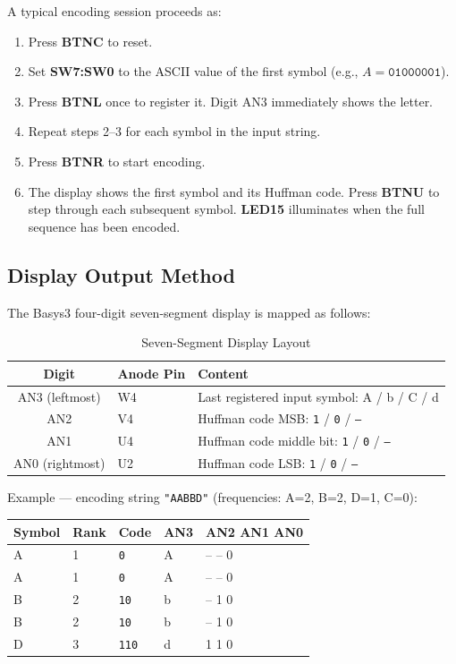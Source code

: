 \documentclass[12pt,a4paper]{article}
\begin{document}
\noindent A typical encoding session proceeds as:
\begin{enumerate}
  \item Press \textbf{BTNC} to reset.
  \item Set \textbf{SW7:SW0} to the ASCII value of the first symbol
        (e.g., $A = \texttt{01000001}$).
  \item Press \textbf{BTNL} once to register it. Digit AN3 immediately shows the
        letter.
  \item Repeat steps 2--3 for each symbol in the input string.
  \item Press \textbf{BTNR} to start encoding.
  \item The display shows the first symbol and its Huffman code. Press
        \textbf{BTNU} to step through each subsequent symbol. \textbf{LED15}
        illuminates when the full sequence has been encoded.
\end{enumerate}

\subsection{Display Output Method}
The Basys3 four-digit seven-segment display is mapped as follows:

\begin{table}[H]
\centering
\caption{Seven-Segment Display Layout}
\begin{tabular}{cll}
\toprule
\textbf{Digit} & \textbf{Anode Pin} & \textbf{Content} \\
\midrule
AN3 (leftmost) & W4 & Last registered input symbol: A / b / C / d \\
AN2            & V4 & Huffman code MSB: \texttt{1} / \texttt{0} / \texttt{--} \\
AN1            & U4 & Huffman code middle bit: \texttt{1} / \texttt{0} / \texttt{--} \\
AN0 (rightmost)& U2 & Huffman code LSB: \texttt{1} / \texttt{0} / \texttt{--} \\
\bottomrule
\end{tabular}
\end{table}

\noindent Example — encoding string \texttt{"AABBD"} (frequencies: A=2, B=2, D=1,
C=0):
\begin{center}
\begin{tabular}{lllll}
\toprule
\textbf{Symbol} & \textbf{Rank} & \textbf{Code} & \textbf{AN3} &
\textbf{AN2 AN1 AN0}\\
\midrule
A & 1 & \texttt{0}   & A & -- -- 0 \\
A & 1 & \texttt{0}   & A & -- -- 0 \\
B & 2 & \texttt{10}  & b & -- 1  0 \\
B & 2 & \texttt{10}  & b & -- 1  0 \\
D & 3 & \texttt{110} & d & 1  1  0 \\
\bottomrule
\end{tabular}
\end{center}
\end{document}

